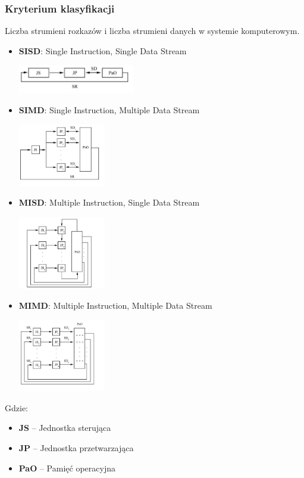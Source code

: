 		\subsubsection{Kryterium klasyfikacji}
			Liczba strumieni rozkazów i liczba strumieni danych w systemie komputerowym.
			\begin{itemize}
				\item \textbf{SISD}: Single Instruction, Single Data Stream
				\begin{center}
					\includegraphics[width=0.4\textwidth]{./images/Flynn01}
				\end{center}
				\item \textbf{SIMD}: Single Instruction, Multiple Data Stream
				\begin{center}
					\includegraphics[width=0.3\textwidth]{./images/Flynn02}
				\end{center}
				\item \textbf{MISD}: Multiple Instruction, Single Data Stream
				\begin{center}
					\includegraphics[width=0.3\textwidth]{./images/Flynn03}
				\end{center}
				\item \textbf{MIMD}: Multiple Instruction, Multiple Data Stream
				\begin{center}
					\includegraphics[width=0.3\textwidth]{./images/Flynn04}
				\end{center}
			\end{itemize}
			Gdzie:
			\begin{itemize}
				\item \textbf{JS} – Jednostka sterująca
				\item \textbf{JP} – Jednostka przetwarzająca
				\item \textbf{PaO} – Pamięć operacyjna
			\end{itemize}
